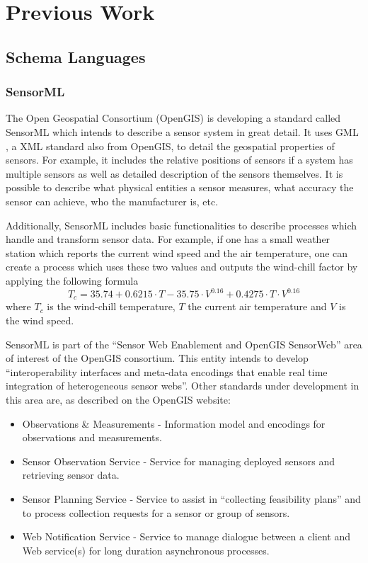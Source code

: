 \section{Previous Work}

\subsection{Schema Languages}
\subsubsection{SensorML}
The Open Geospatial Consortium (OpenGIS) is developing a standard
called SensorML \cite{opengis:sensorml} which intends to describe a
sensor system in great detail. It uses GML \cite{opengis:gml}, a XML
standard also from OpenGIS, to detail the geospatial properties of
sensors. For example, it includes the relative positions of sensors if
a system has multiple sensors as well as detailed description of the
sensors themselves. It is possible to describe what physical entities
a sensor measures, what accuracy the sensor can achieve, who the
manufacturer is, etc.

Additionally, SensorML includes basic functionalities to describe processes
which handle and transform sensor data. For example, if one has a
small weather station which reports the current wind speed and the air
temperature, one can create a process which uses these two values and
outputs the wind-chill factor by applying the following formula
\[T_c = 35.74 + 0.6215\cdot T - 35.75\cdot V^{0.16} + 0.4275\cdot T
\cdot V^{0.16}\]
where $T_c$ is the wind-chill temperature, $T$ the current air
temperature and $V$ is the wind speed.

SensorML is part of the ``Sensor Web Enablement and OpenGIS
SensorWeb'' area of interest of the OpenGIS consortium. This entity
intends to develop ``interoperability interfaces and meta-data
encodings that enable real time integration of heterogeneous sensor
webs''. Other standards under development in this area are, as
described on the OpenGIS website:
\begin{itemize}
\item Observations \& Measurements - Information model and encodings for
observations and measurements.
\item Sensor Observation Service - Service for managing deployed
sensors and retrieving sensor data.
\item Sensor Planning Service - Service to assist in ``collecting
feasibility plans'' and to process collection requests for a sensor or
group of sensors.
\item Web Notification Service - Service to manage dialogue between a
client and Web service(s) for long duration asynchronous processes.
\end{itemize}

